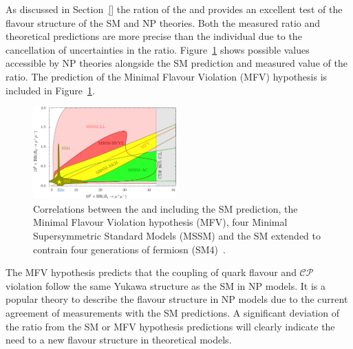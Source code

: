As discussed in Section~\ref{} the ration of the \bdmumu and \bsmumu \Bfs provides an excellent test of the flavour structure of the SM and NP theories. Both the measured ratio and theoretical predictions are more precise than the individual \BFs due to the cancellation of uncertainties in the ratio. Figure~\ref{fig:ratio} shows possible values accessible by NP theories alongside the SM prediction and measured value of the \BF ratio. The prediction of the Minimal Flavour Violation (MFV) hypothesis is included in Figure~\ref{fig:ratio}. 
\begin{figure}[htbp]
    \centering
        \includegraphics[width=0.49\textwidth]{./Figs/Theory/MFV.pdf}
    \caption{Correlations between the \bdmumu and \bsmumu \BFs including the SM prediction, the Minimal Flavour Violation hypothesis (MFV), four Minimal Supersymmetric Standard Models (MSSM) and the SM extended to contrain four generations of fermiosn (SM4)~\cite{Straub:2010ih}.}
    \label{fig:ratio}
\end{figure}
The MFV hypothesis predicts that the coupling of quark flavour and $\mathcal{CP}$ violation follow the same Yukawa structure as the SM in NP models. It is a popular theory to describe the flavour structure in NP models due to the current agreement of measurements with the SM predictions. A significant deviation of the \BF ratio from the SM or MFV hypothesis predictions will clearly indicate the need to a new flavour structure in theoretical models.

